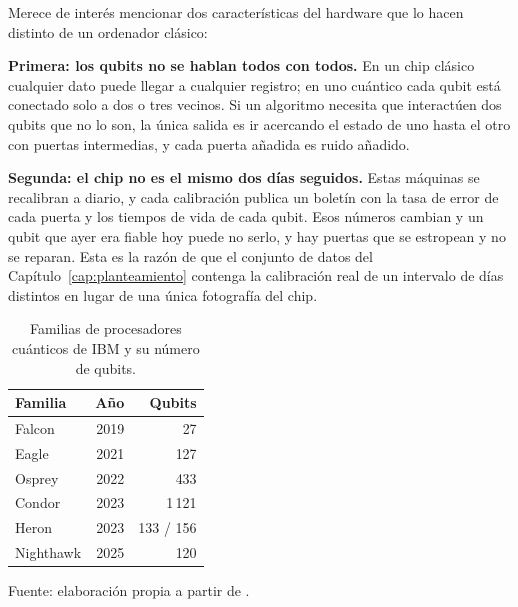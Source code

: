 Merece de interés mencionar dos características del hardware que lo hacen distinto de un ordenador clásico:

\textbf{Primera: los qubits no se hablan todos con todos.} En un chip clásico cualquier
dato puede llegar a cualquier registro; en uno cuántico cada qubit está conectado solo a
dos o tres vecinos. Si un algoritmo necesita que interactúen dos qubits que no lo son, la
única salida es ir acercando el estado de uno hasta el otro con puertas intermedias, y cada
puerta añadida es ruido añadido.

\textbf{Segunda: el chip no es el mismo dos días seguidos.} Estas máquinas se recalibran a
diario, y cada calibración publica un boletín con la tasa de error de cada puerta y los
tiempos de vida de cada qubit. Esos números cambian y un qubit que ayer era fiable hoy puede no serlo, y hay puertas que se estropean y no se reparan.
Esta es la razón de que el conjunto de datos del Capítulo~\ref{cap:planteamiento}
contenga la calibración real de un intervalo de días distintos en lugar de una única
fotografía del chip.

\begin{table}[htbp]
    \centering
    \begin{tabular}{@{}lrr@{}}
        \toprule
        \textbf{Familia} & \textbf{Año} & \textbf{Qubits} \\
        \midrule
        Falcon    & 2019 & 27 \\
        Eagle     & 2021 & 127 \\
        Osprey    & 2022 & 433 \\
        Condor    & 2023 & 1\,121 \\
        Heron     & 2023 & 133 / 156 \\
        Nighthawk & 2025 & 120 \\
        \bottomrule
    \end{tabular}

    \caption{Familias de procesadores cuánticos de IBM y su número de qubits.}
    \label{tab:familias}

    {\footnotesize Fuente: elaboración propia a partir de .}
\end{table}


